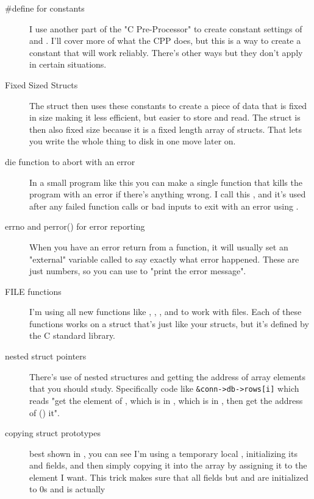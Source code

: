 \begin{description}
\item [\#define for constants] I use another part of the "C Pre-Processor" to
    create constant settings of  and .  I'll
    cover more of what the CPP does, but this is a way to create a constant
    that will work reliably.  There's other ways but they don't apply in
    certain situations.
\item [Fixed Sized Structs] The  struct then uses these
    constants to create a piece of data that is fixed in size making it
    less efficient, but easier to store and read.  The  struct
    is then also fixed size because it is a fixed length array of 
    structs.  That lets you write the whole thing to disk in one move later on.
\item [die function to abort with an error] In a small program like this you
    can make a single function that kills the program with an error if there's
    anything wrong.  I call this , and it's used after any failed
    function calls or bad inputs to exit with an error using .
\item [errno and perror() for error reporting] When you have an error return
    from a function, it will usually set an "external" variable called 
    to say exactly what error happened.  These are just numbers, so you can use
     to "print the error message".
\item [FILE functions] I'm using all new functions like , ,
    , and  to work with files.  Each of these functions
    works on a  struct that's just like your structs, but it's defined
    by the C standard library.
\item [nested struct pointers] There's use of nested structures and getting the
    address of array elements that you should study.  Specifically code like
    \verb|&conn->db->rows[i]| which reads "get the  element of , which is
    in , which is in , then get the address of (\ident{\&}) it".
\item [copying struct prototypes] best shown in , you can
    see I'm using a temporary local , initializing its 
    and  fields, and then simply copying it into the  array by
    assigning it to the element I want.  This trick makes sure that all fields
    but  and  are initialized to 0s and is actually 

\end{description}
